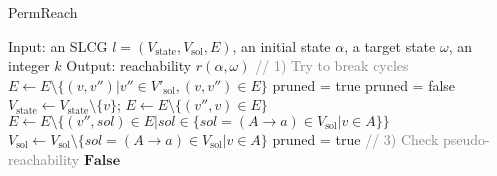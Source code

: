 \begin{algorithm}\caption{PermReach}\label{alg:perm}
\begin{algorithmic}
    \State Input: an SLCG $l=(V_{\mathrm{state}},V_{\mathrm{sol}}, E)$, an initial state $\alpha$, a target state $\omega$, an integer $k$
    \State Output: reachability $r(\alpha,\omega)$
    \State \textcolor{gray}{// 1) Try to break cycles}%
                    \State $E\gets E\setminus \{(v,v'')|v''\in V'_{\mathrm{sol}},(v,v'')\in E\}$
                \EndIf
            \EndFor
        \EndIf
    \EndFor %
    \State{\textcolor{gray}{// 2) Remove useless nodes/edges}} %
    \State pruned = true
        \State pruned = false
                \State $V_{\mathrm{state}} \gets V_{\mathrm{state}}\setminus \{v\}$; $E\gets E\setminus \{ (v'',v)\in E\}$
                \State $E\gets E\setminus \{ (v'',sol)\in E | sol \in \{sol = (A \rightarrow a) \in V_{\mathrm{sol}} | v \in A\}\}$
                \State $V_{\mathrm{sol}} \gets V_{\mathrm{sol}}\setminus \{sol = (A \rightarrow a) \in V_{\mathrm{sol}} | v \in A\}$
                \State pruned = true
            \EndIf
        \EndFor %
    \EndWhile
    \State \textcolor{gray}{// 3) Check pseudo-reachability} %
        \State \Return $\mathbf{False}$
    \EndIf %

\end{algorithmic}
\end{algorithm}

\clearpage

